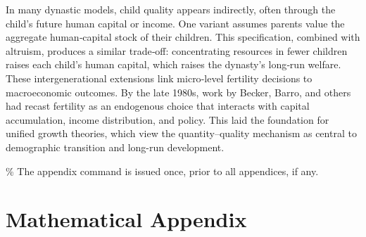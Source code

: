 \documentclass[]{AEA}
\begin{document}
In many dynastic models, child quality appears indirectly, often through
the child's future human capital or income. One variant assumes parents
value the aggregate human‐capital stock of their children. This
specification, combined with altruism, produces a similar trade‐off:
concentrating resources in fewer children raises each child's human
capital, which raises the dynasty's long‐run welfare. These
intergenerational extensions link micro‐level fertility decisions to
macroeconomic outcomes. By the late 1980s, work by Becker, Barro, and
others had recast fertility as an endogenous choice that interacts with
capital accumulation, income distribution, and policy. This laid the
foundation for unified growth theories, which view the quantity--quality
mechanism as central to demographic transition and long-run development.




\% The appendix command is issued once, prior to all appendices, if any.
\appendix

\section{Mathematical Appendix}
\end{document}
